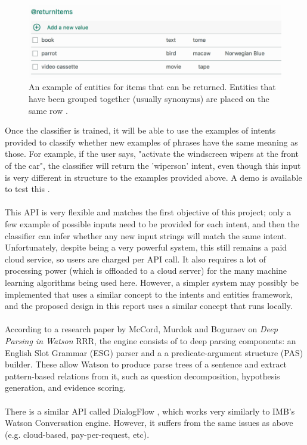\documentclass[12pt]{article}
\begin{document}
\begin{center}
\begin{figure}[H]
  \includegraphics[width=\textwidth]{returnitems.png}
  \caption{An example of entities for items that can be returned. Entities that have been grouped together (usually synonyms) are placed on the same row \cite{RefWorks:34}.}
\end{figure}
\end{center}
Once the classifier is trained, it will be able to use the examples of intents provided to classify whether new examples of phrases have the same meaning as those. For example, if the user says, "activate the windscreen wipers at the front of the car", the classifier will return the 'wipers\textunderscore on' intent, even though this input is very different in structure to the examples provided above. A demo is available to test this \cite{RefWorks:32}.
\\
\\
This API is very flexible and matches the first objective of this project; only a few example of possible inputs need to be provided for each intent, and then the classifier can infer whether any new input strings will match the same intent. Unfortunately, despite being a very powerful system, this still remains a paid cloud service, so users are charged per API call. It also requires a lot of processing power (which is offloaded to a cloud server) for the many machine learning algorithms being used here. However, a simpler system may possibly be implemented that uses a similar concept to the intents and entities framework, and the proposed design in this report uses a similar concept that runs locally.
\\
\\
According to a research paper by McCord, Murdok and Boguraev on \textit{Deep Parsing in Watson} RRR, the engine consists of to deep parsing components: an English Slot Grammar (ESG) parser and a a predicate-argument structure (PAS) builder. These allow Watson to produce parse trees of a sentence and extract pattern-based relations from it, such as question decomposition, hypothesis generation, and evidence scoring.
\\
\\
There is a similar API called DialogFlow \cite{RefWorks:106}, which works very similarly to IMB's Watson Conversation engine. However, it suffers from the same issues as above (e.g. cloud-based, pay-per-request, etc).
\end{document}
